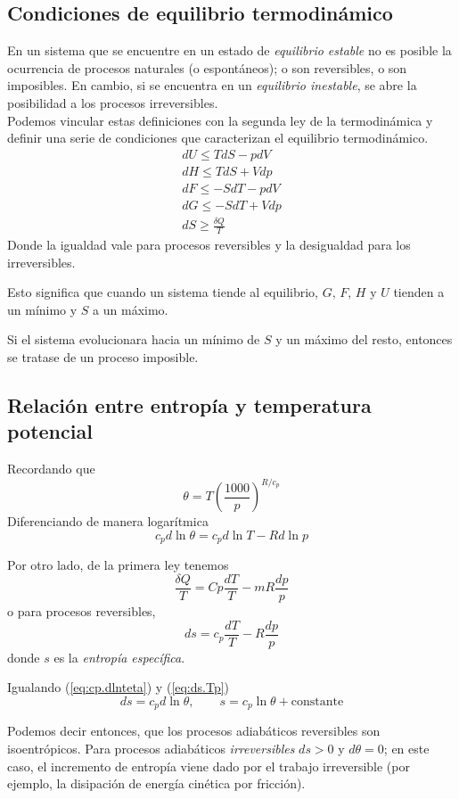 \documentclass[openany]{book}
\begin{document}
\subsection{Condiciones de equilibrio termodinámico}
En un sistema que se encuentre en un estado de \emph{equilibrio estable} no es posible la ocurrencia de procesos naturales (o espontáneos); o son reversibles, o son imposibles. En cambio, si se encuentra en un \emph{equilibrio inestable}, se abre la posibilidad a los procesos irreversibles.\\
Podemos vincular estas definiciones con la segunda ley de la termodinámica y definir una serie de condiciones que caracterizan el equilibrio termodinámico.
\begin{gather*}
	dU\leq TdS-pdV\\
	dH\leq TdS+Vdp\\
	dF\leq -SdT-pdV\\
	dG\leq -SdT+Vdp\\
	dS\geq\frac{\delta Q}{T}
\end{gather*}
Donde la igualdad vale para procesos reversibles y la desigualdad para los irreversibles.
\par Esto significa que cuando un sistema tiende al equilibrio, $G,\, F,\, H$ y $U$ tienden a un mínimo y $S$ a un máximo.
\par Si el sistema evolucionara hacia un mínimo de $S$ y un máximo del resto, entonces se tratase de un proceso imposible.

\subsection{Relación entre entropía y temperatura potencial}
Recordando que
\begin{equation*}
	\theta=T \left(\frac{1000}{p}\right)^{R/c_{p}}
\end{equation*}
Diferenciando de manera logarítmica
\begin{equation}\label{eq:cp.dlnteta}
	c_{p}d\ln{\theta}=c_{p}d\ln{T}-Rd\ln{p}
\end{equation}
\par Por otro lado, de la primera ley tenemos
\begin{equation*}
	\frac{\delta Q}{T}=Cp\frac{dT}{T}-mR\frac{dp}{p}
\end{equation*}
o para procesos reversibles,
\begin{equation}\label{eq:ds.Tp}
	ds=c_{p}\frac{dT}{T}-R\frac{dp}{p}
\end{equation}
donde $s$ es la \emph{entropía específica}.
\par Igualando (\ref{eq:cp.dlnteta}) y (\ref{eq:ds.Tp})
\begin{equation}
	ds=c_{p}d\ln{\theta},\qquad s=c_{p}\ln{\theta}+\mathrm{constante}
\end{equation}
\par Podemos decir entonces, que los procesos adiabáticos reversibles son isoentrópicos. Para procesos adiabáticos \emph{irreversibles} $ds>0$ y $d\theta=0$; en este caso, el incremento de entropía viene dado por el trabajo irreversible (por ejemplo, la disipación de energía cinética por fricción).
\end{document}
